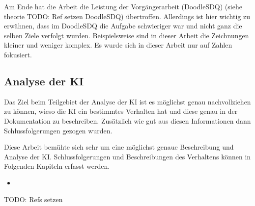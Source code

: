 Am Ende hat die Arbeit die Leistung der Vorgängerarbeit (DoodleSDQ) (siehe theorie  TODO: Ref setzen
DoodleSDQ) übertroffen. Allerdings ist hier wichtig zu erwähnen, dass im
DoodleSDQ die Aufgabe schwieriger war und nicht ganz die selben Ziele verfolgt
wurden. Beispielsweise sind in dieser Arbeit die Zeichnungen kleiner und weniger
komplex. Es wurde sich in dieser Arbeit nur auf Zahlen fokusiert.


\subsection*{Analyse der KI}
Das Ziel beim Teilgebiet der Analyse der KI ist es möglichst genau
nachvollziehen zu können, wieso die KI ein bestimmtes Verhalten hat und diese
genau in der Dokumentation zu beschreiben. Zusätzlich wie gut aus diesen
Informationen dann Schlussfolgerungen gezogen wurden.

Diese Arbeit bemühte sich sehr um eine möglichst genaue Beschreibung und Analyse
der KI. Schlussfolgerungen und Beschreibungen des Verhaltens können in Folgenden Kapiteln erfasst werden.

\begin{itemize}
    \item 
\end{itemize}
TODO: Refs setzen
